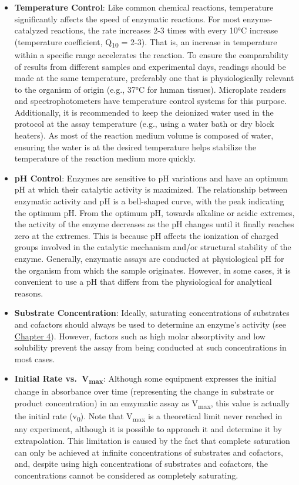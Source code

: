 \documentclass[
  9pt,
  american,
  a5paper,
  extrafontsizes,onecolumn,openright
  ]{memoir}
\begin{document}
\begin{itemize}
\item
  \textbf{Temperature Control}: Like common chemical reactions, temperature significantly affects the speed of enzymatic reactions. For most enzyme-catalyzed reactions, the rate increases 2-3 times with every 10°C increase (temperature coefficient, Q\textsubscript{10} = 2-3). That is, an increase in temperature within a specific range accelerates the reaction. To ensure the comparability of results from different samples and experimental days, readings should be made at the same temperature, preferably one that is physiologically relevant to the organism of origin (e.g., 37°C for human tissues). Microplate readers and spectrophotometers have temperature control systems for this purpose. Additionally, it is recommended to keep the deionized water used in the protocol at the assay temperature (e.g., using a water bath or dry block heaters). As most of the reaction medium volume is composed of water, ensuring the water is at the desired temperature helps stabilize the temperature of the reaction medium more quickly.
\item
  \textbf{pH Control}: Enzymes are sensitive to pH variations and have an optimum pH at which their catalytic activity is maximized. The relationship between enzymatic activity and pH is a bell-shaped curve, with the peak indicating the optimum pH. From the optimum pH, towards alkaline or acidic extremes, the activity of the enzyme decreases as the pH changes until it finally reaches zero at the extremes. This is because pH affects the ionization of charged groups involved in the catalytic mechanism and/or structural stability of the enzyme. Generally, enzymatic assays are conducted at physiological pH for the organism from which the sample originates. However, in some cases, it is convenient to use a pH that differs from the physiological for analytical reasons.
\item
  \textbf{Substrate Concentration}: Ideally, saturating concentrations of substrates and cofactors should always be used to determine an enzyme's activity (see \hyperref[chapter4]{Chapter 4}). However, factors such as high molar absorptivity and low solubility prevent the assay from being conducted at such concentrations in most cases.
\item
  \textbf{Initial Rate vs.~V\textsubscript{max}}: Although some equipment expresses the initial change in absorbance over time (representing the change in substrate or product concentration) in an enzymatic assay as V\textsubscript{max}, this value is actually the initial rate (v\textsubscript{0}). Note that V\textsubscript{max} is a theoretical limit never reached in any experiment, although it is possible to approach it and determine it by extrapolation. This limitation is caused by the fact that complete saturation can only be achieved at infinite concentrations of substrates and cofactors, and, despite using high concentrations of substrates and cofactors, the concentrations cannot be considered as completely saturating.

\end{itemize}
\end{document}
